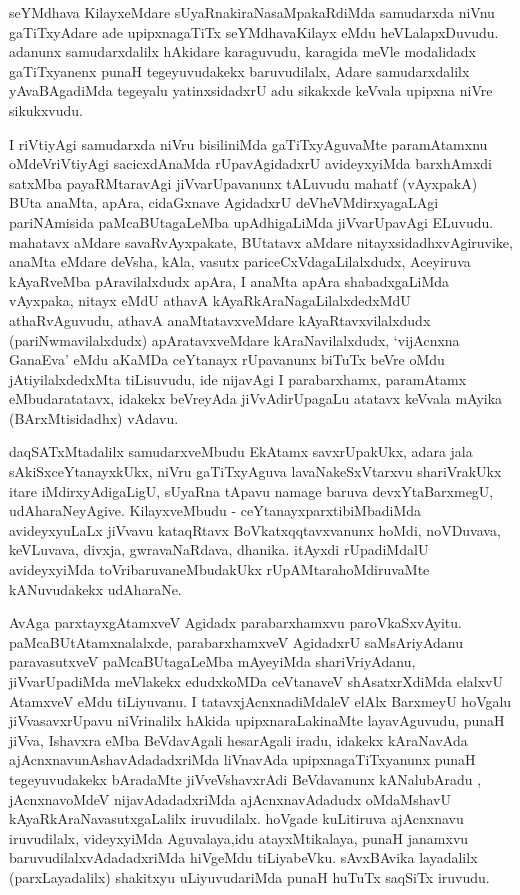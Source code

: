 \begin{artha}
 seYMdhava KilayxeMdare sUyaRnakiraNasaMpakaRdiMda samudarxda niVnu
 gaTiTxyAdare ade upipxnagaTiTx seYMdhavaKilayx eMdu
 heVLalapxDuvudu. adanunx samudarxdalilx hAkidare karaguvudu, karagida
 meVle modalidadx gaTiTxyanenx punaH tegeyuvudakekx baruvudilalx,
 Adare samudarxdalilx yAvaBAgadiMda tegeyalu yatinxsidadxrU adu
 sikakxde keVvala upipxna niVre sikukxvudu.

I riVtiyAgi samudarxda niVru bisiliniMda gaTiTxyAguvaMte  paramAtamxnu
oMdeVriVtiyAgi sacicxdAnaMda rUpavAgidadxrU avideyxyiMda barxhAmxdi
satxMba payaRMtaravAgi jiVvarUpavanunx tALuvudu mahatf (vAyxpakA) BUta
anaMta, apAra, cidaGxnave AgidadxrU deVheVMdirxyagaLAgi pariNAmisida
paMcaBUtagaLeMba upAdhigaLiMda jiVvarUpavAgi ELuvudu. mahatavx aMdare
savaRvAyxpakate, BUtatavx aMdare nitayxsidadhxvAgiruvike, anaMta
eMdare deVsha, kAla, vasutx pariceCxVdagaLilalxdudx, Aceyiruva
kAyaRveMba pAravilalxdudx apAra, I anaMta apAra shabadxgaLiMda
vAyxpaka, nitayx eMdU athavA kAyaRkAraNagaLilalxdedxMdU athaRvAguvudu,
athavA anaMtatavxveMdare kAyaRtavxvilalxdudx (pariNwmavilalxdudx)
apAratavxveMdare kAraNavilalxdudx, `vijAcnxna GanaEva' eMdu aKaMDa ceYtanayx
rUpavanunx biTuTx beVre oMdu jAtiyilalxdedxMta tiLisuvudu, ide
nijavAgi I parabarxhamx, paramAtamx eMbudaratatavx, idakekx beVreyAda
jiVvAdirUpagaLu atatavx keVvala mAyika (BArxMtisidadhx) vAdavu. 

daqSATxMtadalilx samudarxveMbudu EkAtamx savxrUpakUkx, adara jala
sAkiSxceYtanayxkUkx, niVru gaTiTxyAguva lavaNakeSxVtarxvu shariVrakUkx
itare iMdirxyAdigaLigU, sUyaRna tApavu namage baruva devxYtaBarxmegU,
udAharaNeyAgive. KilayxveMbudu - ceYtanayx\-parxtibiMbadiMda avideyxyuLaLx
jiVvavu kataqRtavx BoVkatxqqtavxvanunx hoMdi, \break noVDuvava, keVLuvava,
divxja, gwravaNaRdava, dhanika. itAyxdi rUpadiMdalU avideyxyiMda
toVribaruvaneMbudakUkx rUpAMtarahoMdiruvaMte kANuvudakekx udAharaNe.

AvAga parxtayxgAtamxveV Agidadx parabarxhamxvu
paroVkaSxvAyitu. \-paMcaBUtAtamxnalalxde, parabarxhamxveV AgidadxrU
saMsAriyAdanu paravasutxveV paMcaBUtagaLeMba mAye\-yiMda shariVriyAdanu,
jiVvarUpadiMda meVlakekx edudxkoMDa ceVtanaveV shAsatxrX\-diMda elalxvU AtamxveV
eMdu tiLiyuvanu. I tatavxjAcnxnadiMdaleV elAlx BarxmeyU hoVgalu
jiVvasavxrUpavu niVrinalilx hAkida upipxnaraLakinaMte layavAguvudu,
punaH jiVva, Ishavxra eMba BeVdavAgali hesarAgali iradu, idakekx
kAraNavAda ajAcnxnavunAshavAdadadxriMda liVnavAda
upipxnagaTiTxyanunx punaH tegeyuvudakekx bAra\-daMte jiVveVshavxrAdi
BeVdavanunx kANalubAradu , jAcnxnavoMdeV nijavAdadadxriMda
ajAcnxnavAdadudx oMdaMshavU kAyaRkAraNavasutxgaLalilx
iruvudilalx. hoVgade \-kuLitiruva ajAcnxnavu iruvudilalx, videyxyiMda
Aguvalaya,idu atayxMtikalaya, punaH janamxvu baruvudilalxvAdadadxriMda
hiVgeMdu tiLiyabeVku. sAvxBAvika layadalilx (parxLayadalilx) shakitxyu
uLiyuvudariMda punaH huTuTx saqSiTx iruvudu.
\end{artha}
